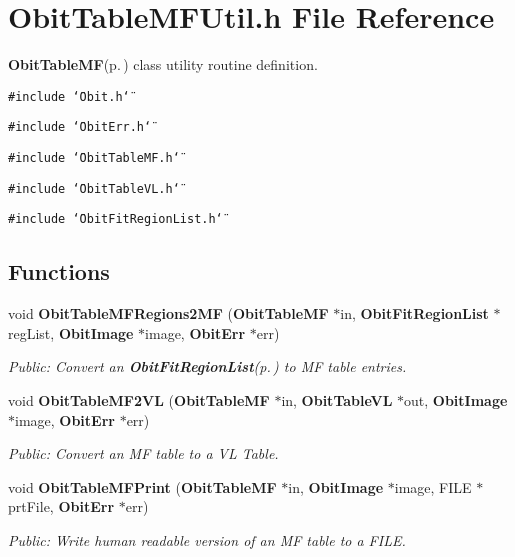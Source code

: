 \section{Obit\-Table\-MFUtil.h File Reference}
\label{ObitTableMFUtil_8h}
{\bf Obit\-Table\-MF}{\rm (p.\,\pageref{structObitTableMF})} class utility routine definition. 

{\tt \#include \char`\"{}Obit.h\char`\"{}}\par
{\tt \#include \char`\"{}Obit\-Err.h\char`\"{}}\par
{\tt \#include \char`\"{}Obit\-Table\-MF.h\char`\"{}}\par
{\tt \#include \char`\"{}Obit\-Table\-VL.h\char`\"{}}\par
{\tt \#include \char`\"{}Obit\-Fit\-Region\-List.h\char`\"{}}\par
\subsection*{Functions}
\begin{CompactItemize}
\item 
void {\bf Obit\-Table\-MFRegions2MF} ({\bf Obit\-Table\-MF} $\ast$in, {\bf Obit\-Fit\-Region\-List} $\ast$reg\-List, {\bf Obit\-Image} $\ast$image, {\bf Obit\-Err} $\ast$err)
\begin{CompactList}\small\item\em Public: Convert an {\bf Obit\-Fit\-Region\-List}{\rm (p.\,\pageref{structObitFitRegionList})} to MF table entries. \item\end{CompactList}\item 
void {\bf Obit\-Table\-MF2VL} ({\bf Obit\-Table\-MF} $\ast$in, {\bf Obit\-Table\-VL} $\ast$out, {\bf Obit\-Image} $\ast$image, {\bf Obit\-Err} $\ast$err)
\begin{CompactList}\small\item\em Public: Convert an MF table to a VL Table. \item\end{CompactList}\item 
void {\bf Obit\-Table\-MFPrint} ({\bf Obit\-Table\-MF} $\ast$in, {\bf Obit\-Image} $\ast$image, FILE $\ast$prt\-File, {\bf Obit\-Err} $\ast$err)
\begin{CompactList}\small\item\em Public: Write human readable version of an MF table to a FILE. \item\end{CompactList}\end{CompactItemize}


